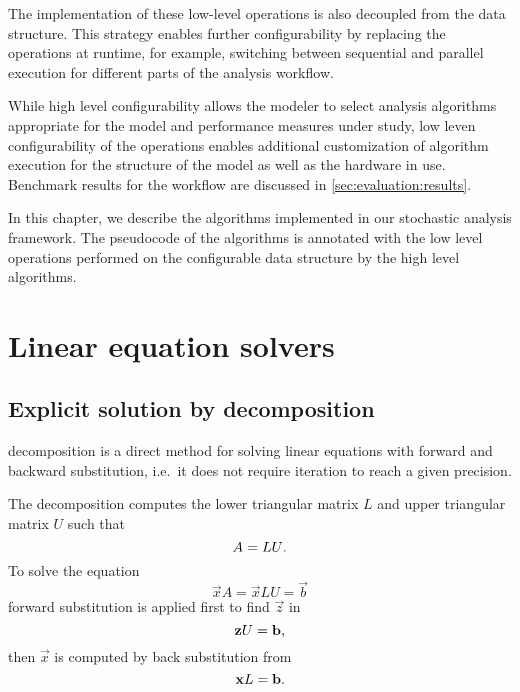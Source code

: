 The implementation of these low-level operations is also decoupled
from the data structure. This strategy enables further configurability
by replacing the operations at runtime, for example, switching between
sequential and parallel execution for different parts of the analysis
workflow.

While high level configurability allows the modeler to select analysis
algorithms appropriate for the model and performance measures under
study, low leven configurability of the operations enables additional
customization of algorithm execution for the structure of the model as
well as the hardware in use. Benchmark results for the workflow are
discussed in \vref{sec:evaluation:results}.

In this chapter, we describe the algorithms implemented in our
stochastic analysis framework. The pseudocode of the algorithms is
annotated with the low level operations performed on the configurable
data structure by the high level algorithms.

\section{Linear equation solvers}
\label{sec:algorithms:solvers}

\subsection{Explicit solution by  decomposition}
\label{ssec:algorithms:lu}

 decomposition is a direct method for solving linear
equations with forward and backward substitution, i.e.~it does not
require iteration to reach a given precision.

The decomposition computes the lower triangular matrix $L$ and upper
triangular matrix $U$ such that
\begin{equation}
  A = LU \text.
\end{equation}
To solve the equation
\begin{equation}
  \vec{x} A = \vec{x} LU = \vec{b}
\end{equation}
forward substitution is applied first to find $\vec{z}$ in
\begin{equation}
  \vec{z} U = \vec{b}\text,
\end{equation}
then $\vec{x}$ is computed by back substitution from
\begin{equation}
  \vec{x} L = \vec{b}\text.
\end{equation}

